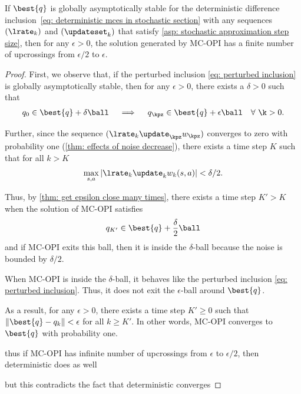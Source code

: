 \begin{lemma}
    If $\best{q}$ is globally asymptotically stable for the deterministic difference inclusion~\eqref{eq: deterministic mces in stochastic section} with any sequences $(\lrate_k)$ and $(\updateset_k)$ that satisfy \autoref{asp: stochastic approximation step size},
    then for any $\epsilon>0$, the solution generated by MC-OPI has a finite number of upcrossings from $\epsilon/2$ to $\epsilon$.
\end{lemma}

\begin{proof}

First, we observe that, if the perturbed inclusion \autoref{eq: perturbed inclusion} is globally asymptotically stable, then for any $\epsilon > 0$, there exists a $\delta > 0$ such that
\begin{align*}
    q_0 \in \best{q} + \delta \ball 
    \quad \implies \quad
    q_\kpz \in \best{q} + \epsilon \ball \quad \forall \ \k>0 .
\end{align*}

Further, since the sequence $(\lrate_k \update_\kpz w_\kpz)$ converges to zero with probability one (\autoref{thm: effects of noise decrease}),
there exists a time step $K$ such that for all $k>K$
\begin{align}
    \max_{s,a} | \lrate_k \update_k w_k(s,a) | < \delta/2 .
\end{align}

Thus, by \autoref{thm: get epsilon close many times}, there exists a time step $K'>K$ when the solution of MC-OPI satisfies
\begin{align}
    q_{K'} \in \best{q} + \frac{\delta}{2} \ball
\end{align}
and if MC-OPI exits this ball, then it is inside the $\delta$-ball because the noise is bounded by $\delta/2$.

When MC-OPI is inside the $\delta$-ball, it behaves like the perturbed inclusion \autoref{eq: perturbed inclusion}. Thus, it does not exit the $\epsilon$-ball around $\best{q}$.

As a result, for any $\epsilon > 0$, there exists a time step $K' \geq 0$ such that $\|\best{q} - q_k\| < \epsilon$ for all $k \geq K'$.
In other words, MC-OPI converges to $\best{q}$ with probability one.


thus if MC-OPI has infinite number of upcrossings from $\epsilon$ to $\epsilon/2$, then deterministic does as well

but this contradicts the fact that deterministic converges



\end{proof}
